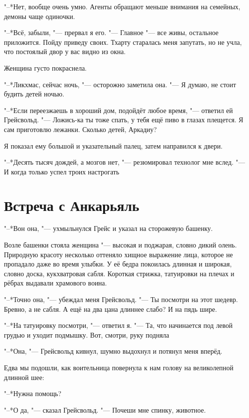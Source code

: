 \documentclass[a4paper,10pt]{book}
\newcommand{\mulang}[3]{#2}%
\newcommand{\ldotst}{\so{...}\xspace}
\begin{document}
"--*Нет, вообще очень умно. Агенты обращают меньше внимания на семейных, демоны 
чаще одиночки.

"--*Всё, забыли, "--- прервал я его. "--- Главное 
"--- все живы, остальное приложится. Пойду приведу своих. Тхарту старалась меня 
запутать, 
но не учла, что постоялый двор у вас видно из окна.

Женщина густо покраснела.

"--*Ликхмас, сейчас ночь, "--- осторожно заметила она. "--- Я думаю, не стоит 
будить детей ночью.

"--*Если переезжаешь в хороший дом, подойдёт любое время, "--- 
ответил ей Грейсвольд. "--- Ложись-ка ты тоже спать, у тебя ещё пиво в глазах 
плещется. Я сам приготовлю лежанки. Сколько детей, Аркадиу?

Я показал ему большой и указательный палец, затем направился к двери.

\mulang{}{"--*Десять тысяч дождей, а мозгов нет, "--- резюмировал технолог мне 
вслед.}
{``Ten thousand rains, has got no brains,'' the technologist summed up to my 
back.}
"--- И когда только успел троих настрогать\ldotst

\section{Встреча с Анкарьяль}

"--*Вон она, "--- ухмыльнулся Грейс и указал на сторожевую башенку.

Возле башенки стояла женщина "--- высокая и поджарая, словно дикий олень. 
Природную красоту несколько оттеняло хищное выражение лица, которое не 
пропадало 
даже во время улыбки. У её бедра покоилась длинная и широкая, словно доска, 
кукхватровая сабля. Короткая стрижка, татуировки на плечах и рёбрах выдавали 
храмового 
воина.

"--*Точно она, "--- убеждал меня Грейсвольд. "--- Ты посмотри на этот шедевр. 
Бревно, а не сабля. А ещё на два цана длиннее слабо? И на пядь шире.

"--*На татуировку посмотри, "--- ответил я. "--- Та, что начинается под левой 
грудью
и уходит подмышку. Вот, смотри, руку подняла\ldotst

"--*Она, "--- Грейсвольд кивнул, шумно выдохнул и потянул меня вперёд.

Едва мы подошли, как воительница повернула к нам голову на великолепной длинной 
шее:

"--*Нужна помощь?

"--*О да, "--- сказал Грейсвольд. "--- Почеши мне спинку, животное.
\end{document}
